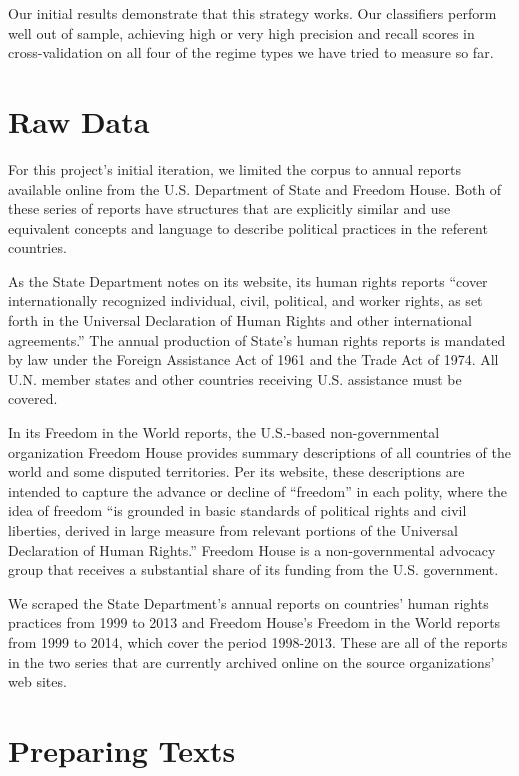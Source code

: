 \documentclass[pdftex,12pt,fullpage,oneside]{amsart}
\begin{document}
Our initial results demonstrate that this strategy works. Our classifiers perform well out of sample, achieving high or very high precision and recall scores in cross-validation on all four of the regime types we have tried to measure so far. 

\section{Raw Data}

For this project's initial iteration, we limited the corpus to annual reports available online from the U.S. Department of State and Freedom House. Both of these series of reports have structures that are explicitly similar and use equivalent concepts and language to describe political practices in the referent countries.

As the State Department notes on its website, its human rights reports ``cover internationally recognized individual, civil, political, and worker rights, as set forth in the Universal Declaration of Human Rights and other international agreements.'' The annual production of State's human rights reports is mandated by law under the Foreign Assistance Act of 1961 and the Trade Act of 1974. All U.N. member states and other countries receiving U.S. assistance must be covered.

In its Freedom in the World reports, the U.S.-based non-governmental organization Freedom House provides summary descriptions of all countries of the world and some disputed territories. Per its website, these descriptions are intended to capture the advance or decline of ``freedom'' in each polity, where the idea of freedom ``is grounded in basic standards of political rights and civil liberties, derived in large measure from relevant portions of the Universal Declaration of Human Rights.'' Freedom House is a non-governmental advocacy group that receives a substantial share of its funding from the U.S. government.

We scraped the State Department's annual reports on countries' human rights practices from 1999 to 2013 and Freedom House's Freedom in the World reports from 1999 to 2014, which cover the period 1998-2013. These are all of the reports in the two series that are currently archived online on the source organizations' web sites.

\section{Preparing Texts}
\end{document}

